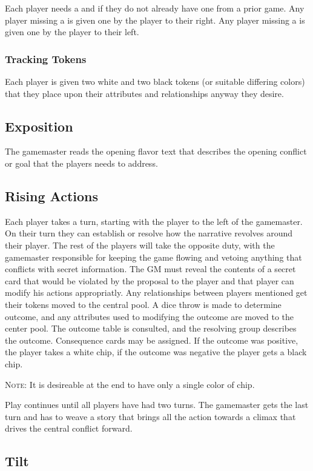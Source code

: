 Each player needs a  and   if they do not already have one from a prior game. Any player missing a  is given one by the player to their right. Any player missing a  is given one by the player to their left. 

\subsubsection{Tracking Tokens} Each player is given two white and two black tokens (or suitable differing colors) that they place upon their attributes and relationships anyway they desire.

\subsection{Exposition} The gamemaster reads the opening flavor text that describes the opening conflict or goal that the players needs to address.

\subsection{Rising Actions} Each player takes a turn, starting with the player to the left of the gamemaster. On their turn they can establish or resolve how the narrative revolves around their player. The rest of the players will take the opposite duty, with the gamemaster responsible for keeping the game flowing and vetoing anything that conflicts with secret information. The GM must reveal the contents of a secret card that would be violated by the proposal to the player and that player can modify his actions appropriatly. Any relationships between players mentioned get their tokens moved to the central pool. A dice throw is made to determine outcome, and any attributes used to modifying the outcome are moved to the center pool. The outcome table is consulted, and the resolving group describes the outcome. Consequence cards may be assigned. If the outcome was positive, the player takes a white chip, if the outcome was negative the player gets a black chip.

\textsc{Note:} It is desireable at the end to have only a single color of chip. 

Play continues until all players have had two turns. The gamemaster gets the last turn and has to weave a story that brings all the action towards a climax that drives the central conflict forward.

\subsection{Tilt}

